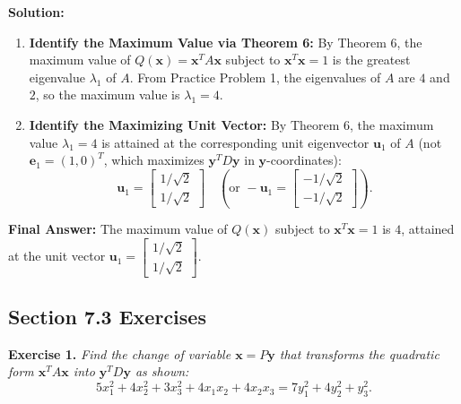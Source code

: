 \documentclass[11pt, letterpaper]{article}
\theoremstyle{definition}
\theoremstyle{remark}
\begin{document}
\textbf{Solution:}
\begin{enumerate}[label=\textbf{Step \arabic*:}]
    \item \textbf{Identify the Maximum Value via Theorem 6:}
    By Theorem 6, the maximum value of $Q(\mathbf{x}) = \mathbf{x}^T A \mathbf{x}$ subject to $\mathbf{x}^T\mathbf{x} = 1$ is the greatest eigenvalue $\lambda_1$ of $A$. From Practice Problem 1, the eigenvalues of $A$ are $4$ and $2$, so the maximum value is $\lambda_1 = 4$.
    \item \textbf{Identify the Maximizing Unit Vector:}
    By Theorem 6, the maximum value $\lambda_1 = 4$ is attained at the corresponding unit eigenvector $\mathbf{u}_1$ of $A$ (not $\mathbf{e}_1 = (1,0)^T$, which maximizes $\mathbf{y}^T D \mathbf{y}$ in $\mathbf{y}$-coordinates):
    \[
    \mathbf{u}_1 = \begin{bmatrix} 1/\sqrt{2} \\ 1/\sqrt{2} \end{bmatrix} \quad \left(\text{or } -\mathbf{u}_1 = \begin{bmatrix} -1/\sqrt{2} \\ -1/\sqrt{2} \end{bmatrix}\right).
    \]
\end{enumerate}
\textbf{Final Answer:} The maximum value of $Q(\mathbf{x})$ subject to $\mathbf{x}^T\mathbf{x} = 1$ is $4$, attained at the unit vector $\mathbf{u}_1 = \begin{bmatrix} 1/\sqrt{2} \\ 1/\sqrt{2} \end{bmatrix}$.

\newpage
\subsection{Section 7.3 Exercises}

\textbf{Exercise 1.} \emph{Find the change of variable $\mathbf{x} = P\mathbf{y}$ that transforms the quadratic form $\mathbf{x}^T A \mathbf{x}$ into $\mathbf{y}^T D \mathbf{y}$ as shown:}
\[
5x_1^2 + 4x_2^2 + 3x_3^2 + 4x_1x_2 + 4x_2x_3 = 7y_1^2 + 4y_2^2 + y_3^2.
\]
\end{document}
